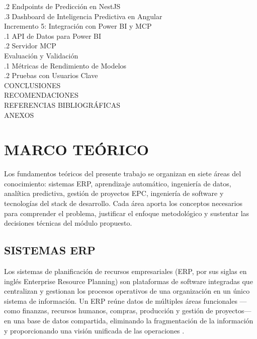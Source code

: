 \documentclass{univalle-perfil}
\begin{document}
\begin{indicetentativo}
\quad{}.2 Endpoints de Predicción en NestJS \\
\quad{}.3 Dashboard de Inteligencia Predictiva en Angular \\
 Incremento 5: Integración con Power BI y MCP \\
\quad{}.1 API de Datos para Power BI \\
\quad{}.2 Servidor MCP \\
 Evaluación y Validación \\
\quad{}.1 Métricas de Rendimiento de Modelos \\
\quad{}.2 Pruebas con Usuarios Clave \\[2pt]
CONCLUSIONES \\
RECOMENDACIONES \\
REFERENCIAS BIBLIOGRÁFICAS \\
ANEXOS
\end{indicetentativo}

\section{MARCO TEÓRICO}

Los fundamentos teóricos del presente trabajo se organizan en siete áreas del conocimiento: sistemas ERP, aprendizaje automático, ingeniería de datos, analítica predictiva, gestión de proyectos EPC, ingeniería de software y tecnologías del stack de desarrollo. Cada área aporta los conceptos necesarios para comprender el problema, justificar el enfoque metodológico y sustentar las decisiones técnicas del módulo propuesto.

\subsection{SISTEMAS ERP}

Los sistemas de planificación de recursos empresariales (ERP, por sus siglas en inglés Enterprise Resource Planning) son plataformas de software integradas que centralizan y gestionan los procesos operativos de una organización en un único sistema de información. Un ERP reúne datos de múltiples áreas funcionales —como finanzas, recursos humanos, compras, producción y gestión de proyectos— en una base de datos compartida, eliminando la fragmentación de la información y proporcionando una visión unificada de las operaciones \parencite{MLdrivenERP2023}.
\end{document}
